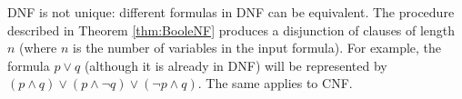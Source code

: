 

\setcounter{section}{1}
\setcounter{subsection}{5}
\setcounter{dfn}{20}


DNF is not unique: different formulas in DNF can be equivalent.
The procedure described in Theorem \ref{thm:BooleNF} produces a disjunction of clauses of length $n$ (where $n$ is the number of variables in the input formula).
For example, the formula $p \vee q$ (although it is already in DNF) will be represented by $(p \wedge q) \vee (p \wedge \neg q) \vee (\neg p \wedge q)$.
The same applies to CNF.





